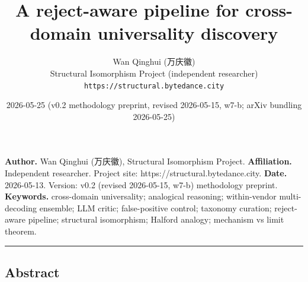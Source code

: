 \documentclass[
  letterpaper,
  11pt]{article}
\title{A reject-aware pipeline for cross-domain universality discovery}
\author{Wan Qinghui (万庆徽)\\\small{Structural Isomorphism Project (independent researcher)}\\\small{\texttt{https://structural.bytedance.city}}}
\date{2026-05-25 (v0.2 methodology preprint, revised 2026-05-15, w7-b; arXiv bundling 2026-05-25)}
\begin{document}
\maketitle

\noindent
\textbf{Author.} Wan Qinghui (万庆徽), Structural Isomorphism Project.
\textbf{Affiliation.} Independent researcher. Project site:
https://structural.bytedance.city. \textbf{Date.} 2026-05-13. Version:
v0.2 (revised 2026-05-15, w7-b) methodology preprint. \textbf{Keywords.}
cross-domain universality; analogical reasoning; within-vendor
multi-decoding ensemble; LLM critic; false-positive control; taxonomy
curation; reject-aware pipeline; structural isomorphism; Halford
analogy; mechanism vs limit theorem.

\begin{center}\rule{0.5\linewidth}{0.5pt}\end{center}

\subsection{Abstract}\label{abstract}
\end{document}
